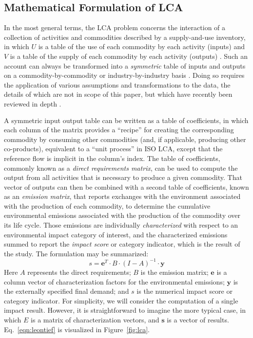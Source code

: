 \subsection{Mathematical Formulation of LCA}

In the most general terms, the LCA problem concerns the interaction of a collection of activities and commodities described by a supply-and-use inventory, in which $U$ is a table of the use of each commodity by each activity (inputs) and $V$ is a table of the supply of each commodity by each activity (outputs) \citep{Pauliuk_2015_framework}.  Such an account can always be transformed into a \textit{symmetric} table of inputs and outputs on a commodity-by-commodity or industry-by-industry basis \citep{Eurostat_2008}. Doing so requires the application of various assumptions and transformations to the data, the details of which are not in scope of this paper, but which have recently been reviewed in depth \citep{Suh_JIE_2010, Majeau_Bettez_2014}.  

A symmetric input output table can be written as a table of coefficients, in which each column of the matrix provides a ``recipe'' for creating the corresponding commodity by consuming other commodities (and, if applicable, producing other co-products), equivalent to a ``unit process'' in ISO LCA, except that the reference flow is implicit in the column's index.  The table of coefficients, commonly known as a \textit{direct requirements matrix}, can be used to compute the output from all activities that is necessary to produce a given commodity.  That vector of outputs can then be combined with a second table of coefficients, known as an \textit{emission matrix}, that reports exchanges with the environment associated with the production of each commodity, to determine the cumulative environmental emissions associated with the production of the commodity over its life cycle.  Those emissions are individually \textit{characterized} with respect to an environmental impact category of interest, and the characterized emissions summed to report the \textit{impact score} or category indicator, which is the result of the study.  The formulation may be summarized:
\begin{equation}
s = \mathbf{e}^T \cdot B \cdot \left(I - A\right)^{-1} \cdot \mathbf{y}
\label{eqn:leontief}
\end{equation}
Here $A$ represents the direct requirements; $B$ is the emission matrix;  $\mathbf{e}$ is a column vector of characterization factors for the environmental emissions; $\mathbf{y}$ is the externally specified final demand; and $s$ is the numerical impact score or category indicator.  For simplicity, we will consider the computation of a single impact result.  However, it is straightforward to imagine the more typical case, in which $E$ is a matrix of characterization vectors, and $\mathbf{s}$ is a vector of results.  Eq.~\ref{eqn:leontief} is visualized in Figure~\ref{fig:lca}.


